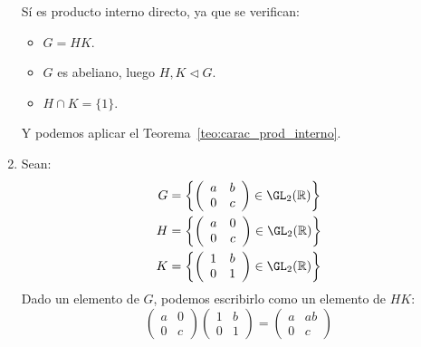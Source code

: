 \begin{ejemplo}
\begin{enumerate}
            Sí es producto interno directo, ya que se verifican:
            \begin{itemize}
                \item $G = HK$.
                \item $G$ es abeliano, luego $H,K\lhd G$.
                \item $H\cap K = \{1\}$.
            \end{itemize}
            Y podemos aplicar el Teorema~\ref{teo:carac_prod_interno}.
        \item Sean:
            \begin{align*}
                G &= \left\{\left(\begin{array}{cc}
                    a & b \\
                    0 & c 
                \end{array}\right) \in \GL_2(\mathbb{R})\right\} \\
                H &= \left\{\left(\begin{array}{cc}
                    a & 0 \\
                    0 & c 
                \end{array}\right)\in \GL_2(\mathbb{R})\right\} \\
                K &= \left\{\left(\begin{array}{cc}
                    1 & b \\
                    0 & 1 
                \end{array}\right) \in \GL_2(\mathbb{R})\right\}
            \end{align*}
            Dado un elemento de $G$, podemos escribirlo como un elemento de $HK$:
            \begin{equation*}
                \left(\begin{array}{cc}
                    a & 0 \\
                    0 & c 
                \end{array}\right)\left(\begin{array}{cc}
                    1 & b \\
                    0 & 1 
                \end{array}\right) = \left(\begin{array}{cc}
                    a & ab \\
                    0 & c 
                \end{array}\right)
            \end{equation*}

\end{enumerate}
\end{ejemplo}
